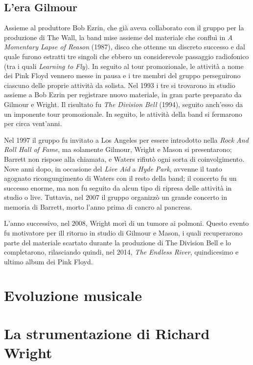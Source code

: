 \documentclass[class=book, crop=false, oneside, 12pt]{standalone}
\begin{document}
    \subsection{L'era Gilmour}
    Assieme al produttore Bob Ezrin, che già aveva collaborato con il gruppo per la produzione di The Wall, la band mise assieme del materiale che confluì in \emph{A Momentary Lapse of Reason} (1987), disco che ottenne un discreto successo e dal quale furono estratti tre singoli che ebbero un considerevole passaggio radiofonico (tra i quali \emph{Learning to Fly}). In seguito al tour promozionale, le attività a nome dei Pink Floyd vennero messe in pausa  e i tre membri del gruppo perseguirono ciascuno delle proprie attività da solista. Nel 1993 i tre si trovarono in studio assieme a Bob Ezrin per registrare nuovo materiale, in gran parte preparato da Gilmour e Wright. Il risultato fu \emph{The Division Bell} (1994), seguito anch'esso da un imponente tour promozionale. In seguito, le attività della band si fermarono per circa vent'anni.

    Nel 1997 il gruppo fu invitato a Los Angeles per essere introdotto nella \emph{Rock And Roll Hall of Fame}, ma solamente Gilmour, Wright e Mason si presentarono; Barrett non rispose alla chiamata, e Waters rifiutò ogni sorta di coinvolgimento. Nove anni dopo, in occasione del \emph{Live Aid} a \emph{Hyde Park}, avvenne il tanto agognato ricongungimento di Waters con il resto della band; il concerto fu un successo enorme, ma non fu seguito da alcun tipo di ripresa delle attività in studio o live. Tuttavia, nel 2007 il gruppo organizzò un grande concerto in memoria di Barrett, morto l'anno prima di cancro al pancreas.

    L'anno successivo, nel 2008, Wright morì di un tumore ai polmoni. Questo evento fu motivatore per ill ritorno in studio di Gilmour e Mason, i quali recuperarono parte del materiale scartato durante la produzione di The Division Bell e lo completarono, rilasciando quindi, nel 2014, \emph{The Endless River}, quindicesimo e ultimo album dei Pink Floyd.
    
    \section{Evoluzione musicale}

    \section{La strumentazione di Richard Wright}
\end{document}

